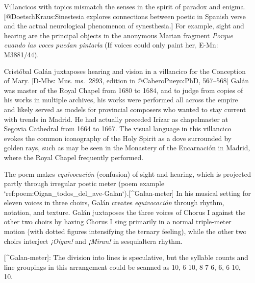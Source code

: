 Villancicos with  topics mismatch the senses in the spirit of paradox and enigma.
[@DoetschKraus:Sinestesia explores connections between poetic  in Spanish verse and the actual neurological phenomenon of synesthesia.]
For example, sight and hearing are the principal objects in the anonymous Marian fragment \emph{Porque cuando las voces puedan pintarla} (If voices could only paint her, E-Mn: M3881/44).

Cristóbal Galán juxtaposes hearing and vision in a villancico for the Conception of Mary.
[D-Mbs: Mus. ms.~2893, edition in @CaberoPueyo:PhD, 567--568]
Galán was master of the Royal Chapel from 1680 to 1684, and to judge from copies of his works in multiple archives, his works were performed all across the empire and likely served as models for provincial composers who wanted to stay current with trends in Madrid.
He had actually preceded Irízar as chapelmaster at Segovia Cathedral from 1664 to 1667.
    \Autocite{Baron-Sage:GalanC}
The visual language in this villancico evokes the common iconography of the Holy Spirit as a dove surrounded by golden rays, such as may be seen in the Monastery of the Encarnación in Madrid, where the Royal Chapel frequently performed.
\Autocite[69--70, 81: The image was painted on the ceiling of the monastery's Capilla del Cordero and when a new church building was added later, this image was incorporated as the central element atop the high altar.]{Sanz:GuiaDescalzasEncarnacion}

The poem makes \emph{equivocación} (confusion) of sight and hearing, which is projected partly through irregular poetic meter (poem example `ref:poem:Oigan_todos_del_ave-Galan`).[^Galan-meter]  In his musical setting for eleven voices in three choirs, Galán creates \emph{equivocación} through rhythm, notation, and texture.
Galán juxtaposes the three voices of Chorus I against the other two choirs by having Chorus I sing primarily in a normal triple-meter motion (with dotted figures intensifying the ternary feeling), while the other two choirs interject \emph{¡Oigan!} and \emph{¡Miran!} in sesquialtera rhythm.

[^Galan-meter]:  The division into lines is speculative, but the syllable counts and line groupings in this arrangement could be scanned as  10, 6 10, 8 7 6, 6, 6 10, 10.


\label{poem:Oigan_todos_del_ave-Galan}

